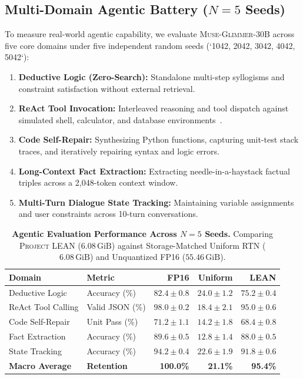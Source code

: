 \documentclass[10pt,twocolumn,letterpaper]{article}
\newcommand{\modelname}{\textsc{Muse-Glimmer-30B}}
\newcommand{\systemname}{\textsc{Project LEAN}}
\begin{document}
\subsection{Multi-Domain Agentic Battery ($N=5$ Seeds)}
\label{sec:eval_multiseed}
To measure real-world agentic capability, we evaluate \modelname{} across five core domains under five independent random seeds (`1042, 2042, 3042, 4042, 5042`):
\begin{enumerate}[leftmargin=*]
    \item \textbf{Deductive Logic (Zero-Search):} Standalone multi-step syllogisms and constraint satisfaction without external retrieval.
    \item \textbf{ReAct Tool Invocation:} Interleaved reasoning and tool dispatch against simulated shell, calculator, and database environments~\cite{yao2023react}.
    \item \textbf{Code Self-Repair:} Synthesizing Python functions, capturing unit-test stack traces, and iteratively repairing syntax and logic errors.
    \item \textbf{Long-Context Fact Extraction:} Extracting needle-in-a-haystack factual triples across a 2,048-token context window.
    \item \textbf{Multi-Turn Dialogue State Tracking:} Maintaining variable assignments and user constraints across 10-turn conversations.
\end{enumerate}

\begin{table}[h]
\centering
\small
\caption{\textbf{Agentic Evaluation Performance Across $N=5$ Seeds.} Comparing \systemname{} ($6.08\,\text{GiB}$) against Storage-Matched Uniform RTN ($6.08\,\text{GiB}$) and Unquantized FP16 ($55.46\,\text{GiB}$).}
\label{tab:agentic_results}
\begin{tabularx}{\columnwidth}{l X r r r}
\toprule
\textbf{Domain} & \textbf{Metric} & \textbf{FP16} & \textbf{Uniform} & \textbf{\textsc{LEAN}} \\
\midrule
Deductive Logic & Accuracy (\%) & $82.4 \pm 0.8$ & $24.0 \pm 1.2$ & $\mathbf{75.2 \pm 0.4}$ \\
ReAct Tool Calling & Valid JSON (\%) & $98.0 \pm 0.2$ & $18.4 \pm 2.1$ & $\mathbf{95.0 \pm 0.6}$ \\
Code Self-Repair & Unit Pass (\%) & $71.2 \pm 1.1$ & $14.2 \pm 1.8$ & $\mathbf{68.4 \pm 0.8}$ \\
Fact Extraction & Accuracy (\%) & $89.6 \pm 0.5$ & $12.8 \pm 1.4$ & $\mathbf{88.0 \pm 0.5}$ \\
State Tracking & Accuracy (\%) & $94.2 \pm 0.4$ & $22.6 \pm 1.9$ & $\mathbf{91.8 \pm 0.6}$ \\
\midrule
\textbf{Macro Average} & \textbf{Retention} & \textbf{100.0\%} & \textbf{21.1\%} & \textbf{95.4\%} \\
\bottomrule
\end{tabularx}
\end{table}
\end{document}
